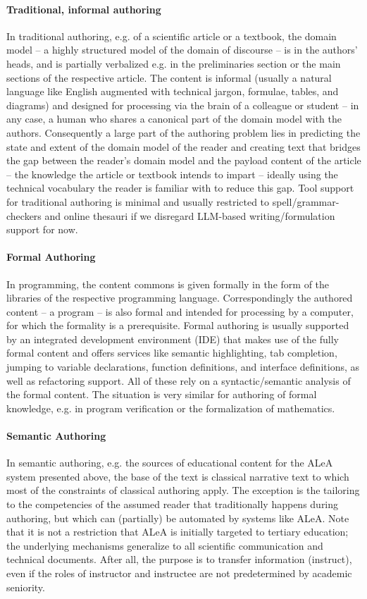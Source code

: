 \documentclass[runningheads]{llncs}
\newcommand\ALeA{\textsf{ALeA}\xspace}
\begin{document}
\paragraph{Traditional, informal authoring}
In traditional authoring, e.g. of a scientific article or a textbook, the domain model --
a highly structured model of the domain of discourse -- is in the authors' heads, and is
partially verbalized e.g. in the preliminaries section or the main sections of the
respective article. The content is informal (usually a natural language like English
augmented with technical jargon, formulae, tables, and diagrams) and designed for
processing via the brain of a colleague or student -- in any case, a human who shares a
canonical part of the domain model with the authors. Consequently a large part of the
authoring problem lies in predicting the state and extent of the domain model of the
reader and creating text that bridges the gap between the reader's domain model and the
payload content of the article -- the knowledge the article or textbook intends to impart
-- ideally using the technical vocabulary the reader is familiar with to reduce this
gap. Tool support for traditional authoring is minimal and usually restricted to
spell/grammar-checkers and online thesauri if we disregard LLM-based writing/formulation
support for now.

\paragraph{Formal Authoring}
In programming, the content commons is given formally in the form of the libraries of the
respective programming language. Correspondingly the authored content -- a program -- is
also formal and intended for processing by a computer, for which the formality is a
prerequisite. Formal authoring is usually supported by an integrated development
environment (IDE) that makes use of the fully formal content and offers services like
semantic highlighting, tab completion, jumping to variable declarations, function
definitions, and interface definitions, as well as refactoring support. All of these rely
on a syntactic/semantic analysis of the formal content. The situation is very similar for
authoring of formal knowledge, e.g. in program verification or the formalization of
mathematics.

\paragraph{Semantic Authoring}
In semantic authoring, e.g. the \sTeX sources of educational content for the \ALeA system
presented above, the base of the text is classical narrative text to which most of the
constraints of classical authoring apply.
The exception is the tailoring to the competencies of the assumed reader
that traditionally happens during authoring, but which can (partially) be automated by systems like
\ALeA. Note that it is not a restriction that \ALeA is initially targeted to tertiary
education; the underlying mechanisms generalize to all scientific communication and
technical documents. After all, the purpose is to transfer information (instruct), even if
the roles of instructor and instructee are not predetermined by academic seniority.
\end{document}
